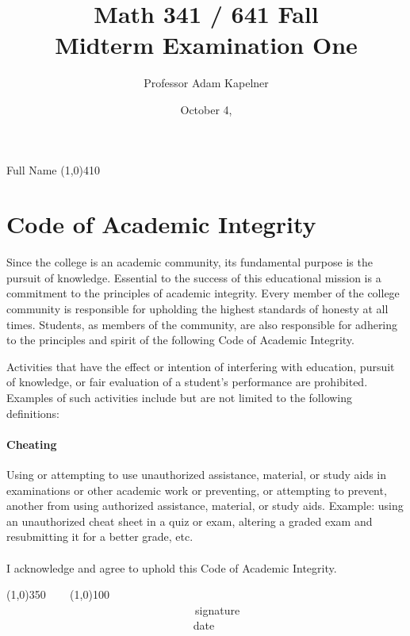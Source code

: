 \documentclass[12pt]{article}
\title{Math 341 / 641 Fall \the\year{} \\ Midterm Examination One \inblue{Solutions}}
\author{Professor Adam Kapelner}
\date{October 4, \the\year{}}
\begin{document}
\maketitle

\noindent Full Name \line(1,0){410}

\thispagestyle{empty}

\section*{Code of Academic Integrity}

\footnotesize
Since the college is an academic community, its fundamental purpose is the pursuit of knowledge. Essential to the success of this educational mission is a commitment to the principles of academic integrity. Every member of the college community is responsible for upholding the highest standards of honesty at all times. Students, as members of the community, are also responsible for adhering to the principles and spirit of the following Code of Academic Integrity.

Activities that have the effect or intention of interfering with education, pursuit of knowledge, or fair evaluation of a student's performance are prohibited. Examples of such activities include but are not limited to the following definitions:

\paragraph{Cheating} Using or attempting to use unauthorized assistance, material, or study aids in examinations or other academic work or preventing, or attempting to prevent, another from using authorized assistance, material, or study aids. Example: using an unauthorized cheat sheet in a quiz or exam, altering a graded exam and resubmitting it for a better grade, etc.\\
\\
\noindent I acknowledge and agree to uphold this Code of Academic Integrity. \\

\begin{center}
\line(1,0){350} ~~~ \line(1,0){100}\\
~~~~~~~~~~~~~~~~~~~~~~~~~~~~~~~~~~signature~~~~~~~~~~~~~~~~~~~~~~~~~~~~~~~~~~~~~~~~~~~~~~~~~~~~~~~~~~~~~~ date
\end{center}

\normalsize
\end{document}
